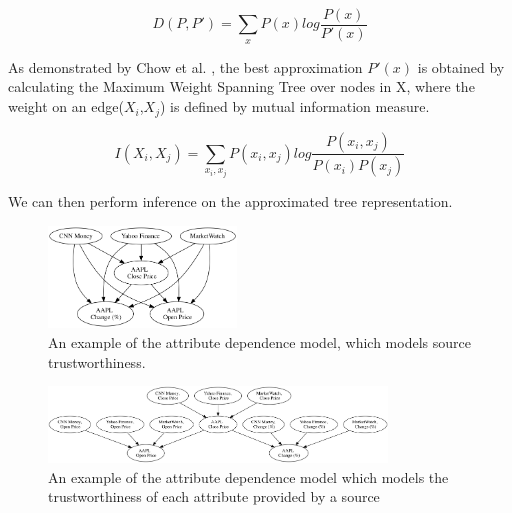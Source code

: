 \documentclass{acm_proc_article-sp}
\begin{document}
\begin{equation}
D(P,P') = \sum_x P(x) log \frac{P(x)}{P'(x)}
\end{equation}

As demonstrated by Chow et al. \cite{chow1968approximating}, the best approximation $P'(x)$ is obtained by calculating the Maximum Weight Spanning Tree over nodes in X, where the weight on an edge($X_i$,$X_j$) is  defined by mutual information measure. 

\begin{equation}
I(X_i,X_j) = \sum_{x_i,x_j} P(x_i,x_j) log\frac{P(x_i,x_j)}{P(x_i) P(x_j)}
\end{equation}

We can then perform inference on the approximated tree representation.

\begin{figure}
\centering
\includegraphics[width=5cm]{bn1.png}
\caption{An example of the attribute dependence model, which models source trustworthiness.}
\label{fig:sourcet}
\end{figure}

\begin{figure}
\centering
\includegraphics[width=9cm]{bn2.png}
\caption{An example of the attribute dependence model which models the trustworthiness of each attribute provided by a source}
\label{fig:attrt}
\end{figure}


  

\balancecolumns
\end{document}
